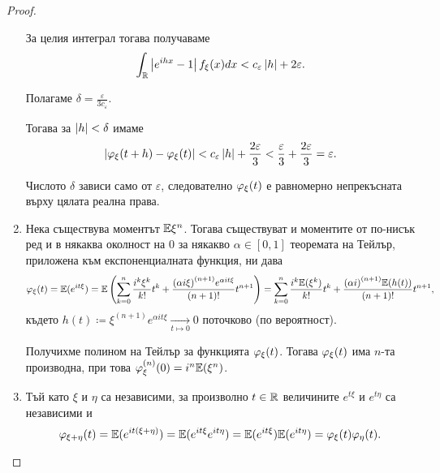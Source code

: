 \documentclass[numbers=endperiod, DIV=15, bibliography=totocnumbered]{scrartcl}
\begin{document}
\begin{proof}
\begin{enumerate}
    За целия интеграл тогава получаваме
    \begin{displaymath}
      \int_{\mathbb{R}} \left\vert e^{ihx} - 1 \right\vert f_\xi(x) dx
      <
      c_\varepsilon \left\vert h \right\vert + 2 \varepsilon.
    \end{displaymath}

    Полагаме $\delta = \frac \varepsilon {3 c_\varepsilon}$.

    Тогава за $\left\vert h \right\vert < \delta$ имаме
    \begin{displaymath}
      \left\vert \varphi_\xi(t + h) - \varphi_\xi(t) \right\vert
      <
      c_\varepsilon \left\vert h \right\vert + \frac {2\varepsilon} 3
      <
      \frac {\varepsilon} 3 + \frac {2\varepsilon} 3
      =
      \varepsilon.
    \end{displaymath}

    Числото $\delta$ зависи само от $\varepsilon$, следователно $\varphi_\xi(t)$ е равномерно непрекъсната върху цялата реална права.

    \item Нека съществува моментът $\mathbb{E} \xi^n$. Тогава съществуват и моментите от по-нисък ред и в някаква околност на $0$ за някакво $\alpha \in [0, 1]$ теоремата на Тейлър, приложена към експоненциалната функция, ни дава
    \begin{displaymath}
      \varphi_\xi(t)
      =
      \mathbb{E}(e^{it\xi})
      =
      \mathbb{E}\left(\sum_{k=0}^n \frac {i^k \xi^k} {k!} t^k + \frac {{(\alpha i \xi)}^{(n+1)} e^{\alpha it \xi}} {(n+1)!} t^{n+1} \right)
      =
      \sum_{k=0}^n \frac {i^k \mathbb{E}(\xi^k)} {k!} t^k + \frac {{(\alpha i)}^{(n+1)} \mathbb{E}(h(t))} {(n+1)!} t^{n+1},
    \end{displaymath}
    където $h(t) \coloneqq \xi^{(n+1)} e^{\alpha it \xi} \underset {t \mapsto 0} \longrightarrow 0$ поточково (по вероятност).

    Получихме полином на Тейлър за функцията $\varphi_\xi(t)$. Тогава $\varphi_\xi(t)$ има $n$-та производна, при това $\varphi^{(n)}_\xi(0) = i^n \mathbb{E}(\xi^n)$.

    \item Тъй като $\xi$ и $\eta$ са независими, за произволно $t \in \mathbb{R}$ величините $e^{t\xi}$ и $e^{t\eta}$ са независими и
    \begin{displaymath}
      \varphi_{\xi + \eta}(t)
      =
      \mathbb{E}(e^{it(\xi + \eta)})
      =
      \mathbb{E}(e^{it\xi} e^{it\eta})
      =
      \mathbb{E}(e^{it\xi}) \mathbb{E}(e^{it\eta})
      =
      \varphi_\xi(t) \varphi_\eta(t).
    \end{displaymath}


\end{enumerate}
\end{proof}
\end{document}
